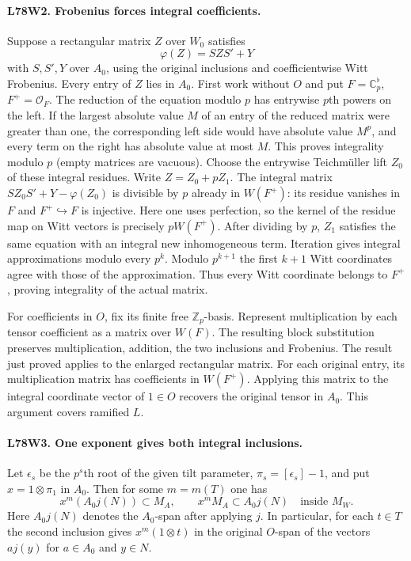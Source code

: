 \paragraph{L78W2. Frobenius forces integral coefficients.}
Suppose a rectangular matrix $Z$ over $W_0$ satisfies
\[
             \varphi(Z)=SZS'+Y
\]
with $S,S',Y$ over $A_0$, using the original inclusions and
coefficientwise Witt Frobenius. Every entry of $Z$ lies in $A_0$.
First work without $O$ and put $F=\mathbb C_p^\flat$,
$F^+=\mathcal O_F$. The reduction of the equation modulo $p$ has
entrywise $p$th powers on the left. If the largest absolute value
$M$ of an entry of the reduced matrix were greater than one,
the corresponding left side would have absolute value $M^p$,
and every term on the right has absolute value at most $M$.
This proves integrality modulo $p$ (empty matrices are
vacuous). Choose the entrywise Teichm\"uller lift $Z_0$ of these
integral residues. Write $Z=Z_0+pZ_1$. The integral matrix
$SZ_0S'+Y-\varphi(Z_0)$ is divisible by $p$ already in $W(F^+)$:
its residue vanishes in $F$ and $F^+\hookrightarrow F$ is
injective. Here one uses perfection, so the kernel of the
residue map on Witt vectors is precisely $pW(F^+)$.
After dividing by $p$, $Z_1$ satisfies the same equation with
an integral new inhomogeneous term. Iteration gives integral
approximations modulo every $p^k$. Modulo $p^{k+1}$ the first
$k+1$ Witt coordinates agree with those of the approximation.
Thus every Witt coordinate belongs to $F^+$, proving integrality
of the actual matrix.

For coefficients in $O$, fix its finite free $\mathbb Z_p$-basis.
Represent multiplication by each tensor coefficient as a matrix over
$W(F)$. The resulting block substitution preserves multiplication,
addition, the two inclusions and Frobenius. The result just proved
applies to the enlarged rectangular matrix. For each original entry,
its multiplication matrix has coefficients in $W(F^+)$. Applying
this matrix to the integral coordinate vector of $1\in O$ recovers
the original tensor in $A_0$. This argument covers ramified $L$.

\paragraph{L78W3. One exponent gives both integral inclusions.}
Let $\epsilon_s$ be the $p^s$th root of the given tilt parameter,
$\pi_s=[\epsilon_s]-1$, and put $x=1\otimes\pi_1$ in $A_0$.
Then for some $m=m(T)$ one has
\[
 x^m (A_0j(N))\subset M_A,\qquad x^mM_A\subset A_0j(N)
 \quad\text{inside }M_W.
\]
Here $A_0j(N)$ denotes the $A_0$-span after applying $j$.
In particular, for each $t\in T$ the second inclusion gives
$x^m(1\otimes t)$ in the original $O$-span of the vectors
$a j(y)$ for $a\in A_0$ and $y\in N$.

